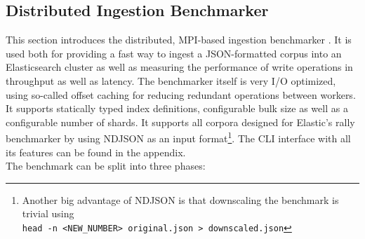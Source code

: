 \newpage

\subsection{Distributed Ingestion Benchmarker}
This section introduces the distributed, \ac{MPI}-based ingestion benchmarker \cite{myingestion}. It is used both for providing a fast way to ingest a \ac{JSON}-formatted corpus into an Elasticsearch cluster as well as measuring the performance of write operations in throughput as well as latency. The benchmarker itself is very I/O optimized, using so-called offset caching for reducing redundant operations between workers. It supports statically typed index definitions, configurable bulk size as well as a configurable number of shards. It supports all corpora designed for Elastic's rally benchmarker by using \ac{NDJSON} as an input format\footnote{Another big advantage of \ac{NDJSON} is that downscaling the benchmark is trivial using\\\texttt{head -n <NEW\_NUMBER> original.json > downscaled.json}}. The \ac{CLI} interface with all its features can be found in the appendix.\\

The benchmark can be split into three phases:

